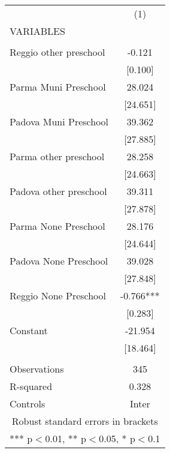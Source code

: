\begin{tabular}{lc} \hline
 & (1) \\
VARIABLES &  \\ \hline
 &  \\
Reggio other preschool & -0.121 \\
 & [0.100] \\
Parma Muni Preschool & 28.024 \\
 & [24.651] \\
Padova Muni Preschool & 39.362 \\
 & [27.885] \\
Parma other preschool & 28.258 \\
 & [24.663] \\
Padova other preschool & 39.311 \\
 & [27.878] \\
Parma None Preschool & 28.176 \\
 & [24.644] \\
Padova None Preschool & 39.028 \\
 & [27.848] \\
Reggio None Preschool & -0.766*** \\
 & [0.283] \\
Constant & -21.954 \\
 & [18.464] \\
 &  \\
Observations & 345 \\
R-squared & 0.328 \\
 Controls & Inter \\ \hline
\multicolumn{2}{c}{ Robust standard errors in brackets} \\
\multicolumn{2}{c}{ *** p$<$0.01, ** p$<$0.05, * p$<$0.1} \\
\end{tabular}
